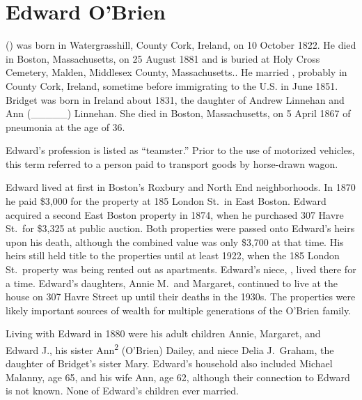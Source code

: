 \section{Edward O'Brien}

 () was born in Watergrasshill, County Cork, Ireland, on 10 October 1822.\cite{Edward2OBrienNaturalization} He died in Boston, Massachusetts, on 25 August 1881\cite{Edward2OBrienDeath} and is buried at Holy Cross Cemetery, Malden, Middlesex County, Massachusetts.\cite{CarolGordon}. He married , probably in County Cork, Ireland, sometime before immigrating to the U.S. in June  1851.\cite{Edward2OBrienNaturalization,Edward2OBrienMarriage} Bridget was born in Ireland about 1831, the daughter of Andrew Linnehan and Ann (\_\_\_\_\_) Linnehan. She died in Boston, Massachusetts, on 5 April 1867 of pneumonia at the age of 36.\cite{BridgetLinnehanDeath}

Edward's profession is listed as ``teamster.''\cite{LondonStDeed,Edward2OBrien1876} Prior to the use of motorized vehicles, this term referred to a person paid to transport goods by horse-drawn wagon.\cite{Teamster}

Edward lived at first in Boston's Roxbury\cite{MaryAnn3OBrienBirth} and North End\cite{Edward3OBrienBirth} neighborhoods. In 1870 he paid \$3,000 for the property at 185 London St.\ in East Boston.\cite{LondonStDeed,LondonStMap} Edward acquired a second East Boston property in 1874, when he purchased 307 Havre St.\ for \$3,325 at public auction.\cite{HavrePurchase,HavreMap} Both properties were passed onto Edward's heirs upon his death, although the combined value was only \$3,700 at that time.\cite{Edward2OBrienProbate} His heirs still held title to the properties until at least 1922,\cite{Bromley1922} when the 185 London St.\ property was being rented out as apartments.\cite{GlobeRobbery} Edward's niece, , lived there for a time.\cite{Frances3OBrien1914} Edward's daughters, Annie M.\ and Margaret, continued to live at the house on 307 Havre Street up until their deaths in the 1930s.\cite{AnnMaria3OBrienDeath,Margaret3OBrienDeath} The properties were likely important sources of wealth for multiple generations of the O'Brien family.

Living with Edward in 1880 were his adult children Annie, Margaret, and Edward J., his sister Ann\textsuperscript{2} (O'Brien) Dailey, and niece Delia J.\ Graham, the daughter of Bridget's sister Mary. Edward's household also included Michael Malanny, age 65, and his wife Ann, age 62, although their connection to Edward is not known.\cite{Census1880Edward} None of Edward's children ever married. 

